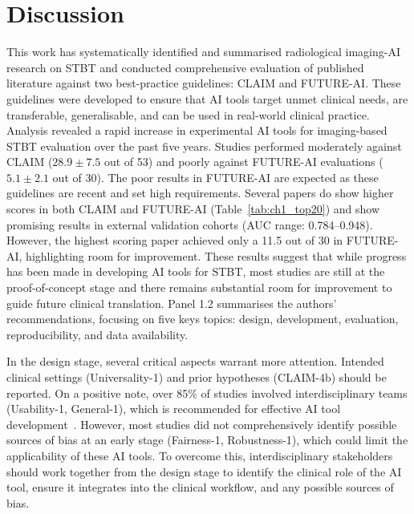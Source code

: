 \section{Discussion}
This work has systematically identified and summarised radiological imaging-AI research on STBT and conducted comprehensive evaluation of published literature against two best-practice guidelines: CLAIM and FUTURE-AI.
These guidelines were developed to ensure that AI tools target unmet clinical needs, are transferable, generalisable, and can be used in real-world clinical practice.
Analysis revealed a rapid increase in experimental AI tools for imaging-based STBT evaluation over the past five years.
Studies performed moderately against CLAIM ($28.9 \pm 7.5$ out of 53) and poorly against FUTURE-AI evaluations ($5.1 \pm 2.1$ out of 30).
The poor results in FUTURE-AI are expected as these guidelines are recent and set high requirements.
Several papers do show higher scores in both CLAIM and FUTURE-AI (Table~\ref{tab:ch1_top20}) and show promising results in external validation cohorts (AUC range: 0.784--0.948).
However, the highest scoring paper achieved only a 11.5 out of 30 in FUTURE-AI, highlighting room for improvement.
These results suggest that while progress has been made in developing AI tools for STBT, most studies are still at the proof-of-concept stage and there remains substantial room for improvement to guide future clinical translation.
Panel 1.2 summarises the authors' recommendations, focusing on five keys topics: design, development, evaluation, reproducibility, and data availability.

In the design stage, several critical aspects warrant more attention.
Intended clinical settings (Universality-1) and prior hypotheses (CLAIM-4b) should be reported.
On a positive note, over 85\% of studies involved interdisciplinary teams (Usability-1, General-1), which is recommended for effective AI tool development~\autocite{lekadir2025}.
However, most studies did not comprehensively identify possible sources of bias at an early stage (Fairness-1, Robustness-1), which could limit the applicability of these AI tools.
To overcome this, interdisciplinary stakeholders should work together from the design stage to identify the clinical role of the AI tool, ensure it integrates into the clinical workflow, and any possible sources of bias.

